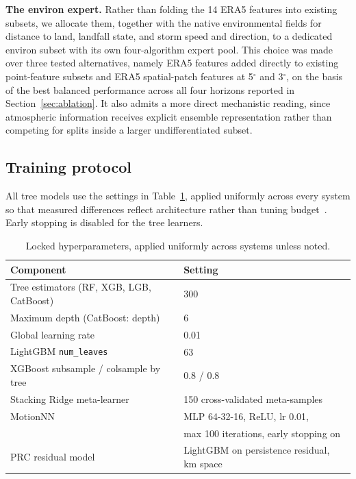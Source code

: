 \documentclass[10pt,twocolumn,a4paper]{article}
\newcommand{\era}{ERA5}
\begin{document}
\textbf{The environ expert.} Rather than folding the 14 \era{} features into
existing subsets, we allocate them, together with the native environmental fields
for distance to land, landfall state, and storm speed and direction, to a
dedicated environ subset with its own four-algorithm expert pool. This choice was
made over three tested alternatives, namely \era{} features added directly to
existing point-feature subsets and \era{} spatial-patch features at 5$^\circ$ and
3$^\circ$, on the basis of the best balanced performance across all four horizons
reported in Section~\ref{sec:ablation}. It also admits a more direct mechanistic
reading, since atmospheric information receives explicit ensemble representation
rather than competing for splits inside a larger undifferentiated subset.

\subsection{Training protocol}
All tree models use the settings in Table~\ref{tab:hyp}, applied uniformly across
every system so that measured differences reflect architecture rather than
tuning budget~\cite{grinsztajn2022tree}. Early stopping is disabled for the tree
learners.

\begin{table}[!t]
\caption{Locked hyperparameters, applied uniformly across systems unless noted.}
\label{tab:hyp}
\centering
\small
\begin{tabular}{@{}ll@{}}
\toprule
Component & Setting \\
\midrule
Tree estimators (RF, XGB, LGB, CatBoost) & 300 \\
Maximum depth (CatBoost: depth)          & 6 \\
Global learning rate                     & 0.01 \\
LightGBM \texttt{num\_leaves}            & 63 \\
XGBoost subsample / colsample by tree    & 0.8 / 0.8 \\
Stacking Ridge meta-learner              & 150 cross-validated meta-samples \\
MotionNN                                 & MLP 64-32-16, ReLU, lr 0.01, \\
                                         & max 100 iterations, early stopping on \\
PRC residual model                       & LightGBM on persistence residual, km space \\
\bottomrule
\end{tabular}
\end{table}
\end{document}
